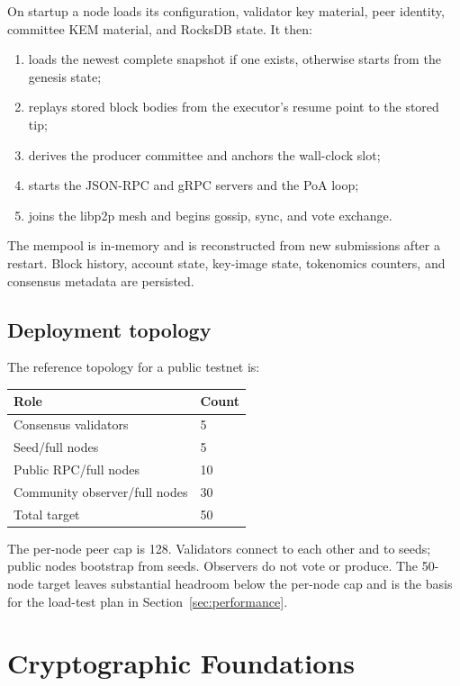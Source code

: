 \documentclass[11pt,a4paper]{article}
\begin{document}
On startup a node loads its configuration, validator key material, peer
identity, committee KEM material, and RocksDB state. It then:

\begin{enumerate}[leftmargin=*]
  \item loads the newest complete snapshot if one exists, otherwise starts
        from the genesis state;
  \item replays stored block bodies from the executor's resume point to the
        stored tip;
  \item derives the producer committee and anchors the wall-clock slot;
  \item starts the JSON-RPC and gRPC servers and the PoA loop;
  \item joins the libp2p mesh and begins gossip, sync, and vote exchange.
\end{enumerate}

The mempool is in-memory and is reconstructed from new submissions after a
restart. Block history, account state, key-image state, tokenomics counters,
and consensus metadata are persisted.

\subsection{Deployment topology}

The reference topology for a public testnet is:

\begin{center}
\begin{tabular}{@{}ll@{}}
\toprule
Role & Count \\
\midrule
Consensus validators & 5 \\
Seed/full nodes & 5 \\
Public RPC/full nodes & 10 \\
Community observer/full nodes & 30 \\
\midrule
Total target & 50 \\
\bottomrule
\end{tabular}
\end{center}

The per-node peer cap is 128. Validators connect to each other and to seeds;
public nodes bootstrap from seeds. Observers do not vote or produce. The
50-node target leaves substantial headroom below the per-node cap and is the
basis for the load-test plan in Section~\ref{sec:performance}.

\section{Cryptographic Foundations}
\end{document}
